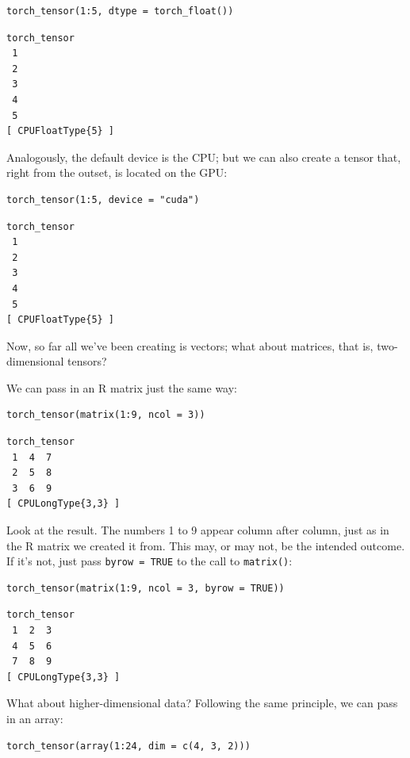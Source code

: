 \documentclass[
  letterpaper,
]{krantz}
\begin{document}
\begin{verbatim}
torch_tensor(1:5, dtype = torch_float())
\end{verbatim}

\begin{verbatim}
torch_tensor
 1
 2
 3
 4
 5
[ CPUFloatType{5} ]
\end{verbatim}

Analogously, the default device is the CPU; but we can also create a
tensor that, right from the outset, is located on the GPU:

\begin{verbatim}
torch_tensor(1:5, device = "cuda")
\end{verbatim}

\begin{verbatim}
torch_tensor
 1
 2
 3
 4
 5
[ CPUFloatType{5} ]
\end{verbatim}

Now, so far all we've been creating is vectors; what about matrices,
that is, two-dimensional tensors?

We can pass in an R matrix just the same way:

\begin{verbatim}
torch_tensor(matrix(1:9, ncol = 3))
\end{verbatim}

\begin{verbatim}
torch_tensor
 1  4  7
 2  5  8
 3  6  9
[ CPULongType{3,3} ]
\end{verbatim}

Look at the result. The numbers 1 to 9 appear column after column, just
as in the R matrix we created it from. This may, or may not, be the
intended outcome. If it's not, just pass \texttt{byrow\ =\ TRUE} to the
call to \texttt{matrix()}:

\begin{verbatim}
torch_tensor(matrix(1:9, ncol = 3, byrow = TRUE))
\end{verbatim}

\begin{verbatim}
torch_tensor
 1  2  3
 4  5  6
 7  8  9
[ CPULongType{3,3} ]
\end{verbatim}

What about higher-dimensional data? Following the same principle, we can
pass in an array:

\begin{verbatim}
torch_tensor(array(1:24, dim = c(4, 3, 2)))
\end{verbatim}
\end{document}
